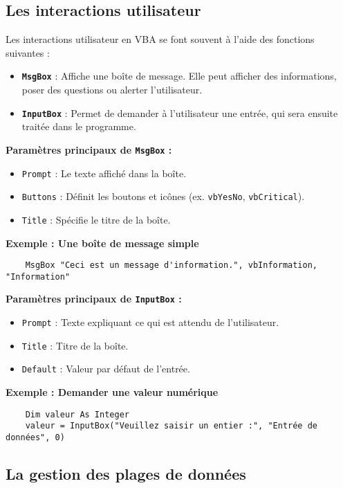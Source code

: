 \documentclass[a4paper,12pt]{report}
\begin{document}
\subsection{Les interactions utilisateur}

Les interactions utilisateur en VBA se font souvent à l'aide des fonctions suivantes :

\begin{itemize}
	\item \textbf{\texttt{MsgBox}} : Affiche une boîte de message. Elle peut afficher des informations, poser des questions ou alerter l'utilisateur.
	\item \textbf{\texttt{InputBox}} : Permet de demander à l'utilisateur une entrée, qui sera ensuite traitée dans le programme.
\end{itemize}

\textbf{Paramètres principaux de \texttt{MsgBox} :}
\begin{itemize}
	\item \texttt{Prompt} : Le texte affiché dans la boîte.
	\item \texttt{Buttons} : Définit les boutons et icônes (ex. \texttt{vbYesNo}, \texttt{vbCritical}).
	\item \texttt{Title} : Spécifie le titre de la boîte.
\end{itemize}

\textbf{Exemple : Une boîte de message simple}
\begin{lstlisting}
	MsgBox "Ceci est un message d'information.", vbInformation, "Information"
\end{lstlisting}

\textbf{Paramètres principaux de \texttt{InputBox} :}
\begin{itemize}
	\item \texttt{Prompt} : Texte expliquant ce qui est attendu de l'utilisateur.
	\item \texttt{Title} : Titre de la boîte.
	\item \texttt{Default} : Valeur par défaut de l'entrée.
\end{itemize}

\textbf{Exemple : Demander une valeur numérique}
\begin{lstlisting}
	Dim valeur As Integer
	valeur = InputBox("Veuillez saisir un entier :", "Entrée de données", 0)
\end{lstlisting}

\subsection{La gestion des plages de données}
\end{document}
